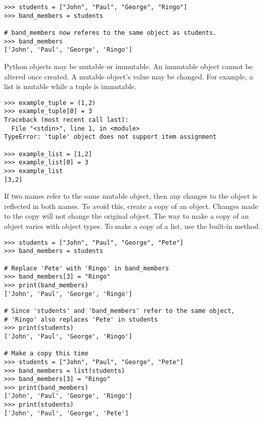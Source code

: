 \begin{lstlisting}
>>> students = ["John", "Paul", "George", "Ringo"]
>>> band_members = students

# band_members now referes to the same object as students.
>>> band_members
['John', 'Paul', 'George', 'Ringo']
\end{lstlisting}

Python objects may be mutable or immutable.
An immutable object cannot be altered once created.
A mutable object's value may be changed.
For example, a list is mutable while a tuple is immutable.
\begin{lstlisting}
>>> example_tuple = (1,2)
>>> example_tuple[0] = 3
Traceback (most recent call last):
  File "<stdin>", line 1, in <module>
TypeError: 'tuple' object does not support item assignment

>>> example_list = [1,2]
>>> example_list[0] = 3
>>> example_list
[3,2]
\end{lstlisting}

If two names refer to the same mutable object, then any changes to the object is reflected in both names.
To avoid this, create a copy of an object.
Changes made to the copy will not change the original object.
The way to make a copy of an object varies with object types.
To make a copy of a list, use the  built-in method.

\begin{lstlisting}
>>> students = ["John", "Paul", "George", "Pete"]
>>> band_members = students

# Replace 'Pete' with 'Ringo' in band_members
>>> band_members[3] = "Ringo"
>>> print(band_members)
['John', 'Paul', 'George', 'Ringo']

# Since 'students' and 'band_members' refer to the same object, 
# 'Ringo' also replaces 'Pete' in students
>>> print(students)
['John', 'Paul', 'George', 'Ringo']

# Make a copy this time
>>> students = ["John", "Paul", "George", "Pete"]
>>> band_members = list(students)
>>> band_members[3] = "Ringo"
>>> print(band_members)
['John', 'Paul', 'George', 'Ringo']
>>> print(students)
['John', 'Paul', 'George', 'Pete']
\end{lstlisting}

